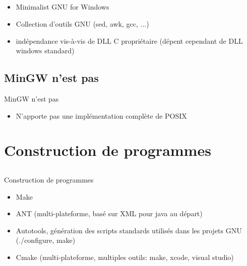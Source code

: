 \subsection{\subsectitle}
\begin{frame}{\sectitle}
    \begin{block}{\subsectitle}
        \begin{itemize}
            \item Minimalist GNU for Windows
            \item Collection d'outils GNU (sed, awk, gcc, ...)
            \item indépendance vis-à-vis de DLL C propriétaire (dépent cependant
                de DLL windows standard)
        \end{itemize}
    \end{block}

\def\subsectitle{MinGW n'est pas}
\subsection{\subsectitle}
    \begin{block}{\subsectitle}
        \begin{itemize}
            \item N'apporte pas une implémentation complète de POSIX
        \end{itemize}
    \end{block}
\end{frame}


\def\sectitle{Construction de programmes}
\section{\sectitle}
\def\subsectitle{}
\subsection{\subsectitle}
\begin{frame}{\sectitle}
    \begin{block}{\subsectitle}
        \begin{itemize}
            \item Make
            \item ANT (multi-plateforme, basé sur XML pour java au départ)
            \item Autotools, génération des scripts standards utilisés dans les
                projets GNU (./configure, make)
            \item Cmake (multi-plateforme, multiples outils: make, xcode, visual
                studio)
        \end{itemize}
    \end{block}
\end{frame}


